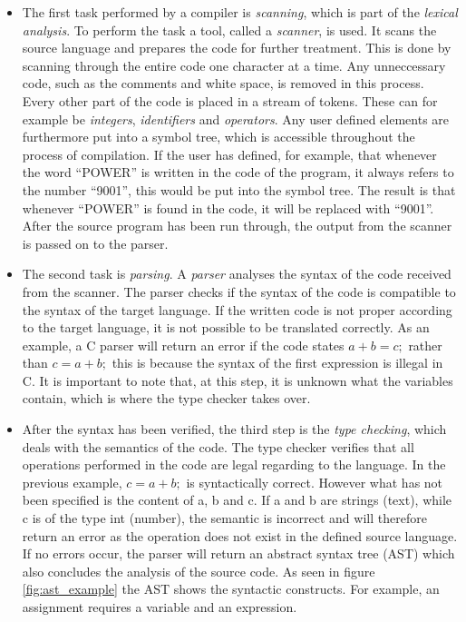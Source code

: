 \begin{itemize}
	\item The first task performed by a compiler is \textit{scanning}, which is part of the \textit{lexical analysis}. To perform the task a tool, called a \textit{scanner}, is used. It scans the source language and prepares the code for further treatment. This is done by scanning through the entire code one character at a time. Any unneccessary code, such as the comments and white space, is removed in this process. Every other part of the code is placed in a stream of tokens. These can for example be \textit{integers}, \textit{identifiers} and \textit{operators}. Any user defined elements are furthermore put into a symbol tree, which is accessible throughout the process of compilation. If the user has defined, for example, that whenever the word ``POWER'' is written in the code of the program, it always refers to the number ``9001'', this would be put into the symbol tree. The result is that whenever ``POWER'' is found in the code, it will be replaced with ``9001''. After the source program has been run through, the output from the scanner is passed on to the parser.
	
	\item The second task is \textit{parsing}. A \textit{parser} analyses the syntax of the code received from the scanner. The parser checks if the syntax of the code is compatible to the syntax of the target language. If the written code is not proper according to the target language, it is not possible to be translated correctly. As an example, a C parser will return an error if the code states $a + b = c;$ rather than $c = a + b;$ this is because the syntax of the first expression is illegal in C. It is important to note that, at this step, it is unknown what the variables contain, which is where the type checker takes over.

	\item After the syntax has been verified, the third step is the \textit{type checking}, which deals with the semantics of the code. The type checker verifies that all operations performed in the code are legal regarding to the language. In the previous example, $c = a + b;$ is syntactically correct. However what has not been specified is the content of a, b and c. If a and b are strings (text), while c is of the type int (number), the semantic is incorrect and will therefore return an error as the operation does not exist in the defined source language. If no errors occur, the parser will return an abstract syntax tree (AST) which also concludes the analysis of the source code. As seen in figure \ref{fig:ast_example} the AST shows the syntactic constructs. For example, an assignment requires a variable and an expression.
	

\end{itemize}
